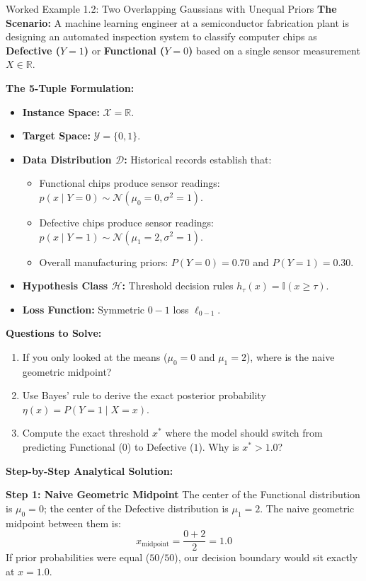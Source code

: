 \begin{examplebox}{Worked Example 1.2: Two Overlapping Gaussians with Unequal Priors}
\label{ex:w01_overlapping_gaussians}
\textbf{The Scenario:}
A machine learning engineer at a semiconductor fabrication plant is designing an automated inspection system to classify computer chips as \textbf{Defective ($Y = 1$)} or \textbf{Functional ($Y = 0$)} based on a single sensor measurement $X \in \mathbb{R}$.

\textbf{The 5-Tuple Formulation:}
\begin{itemize}
    \item \textbf{Instance Space:} $\mathcal{X} = \mathbb{R}$.
    \item \textbf{Target Space:} $\mathcal{Y} = \{0, 1\}$.
    \item \textbf{Data Distribution $\mathcal{D}$:} Historical records establish that:
    \begin{itemize}
        \item Functional chips produce sensor readings: $p(x \mid Y=0) \sim \mathcal{N}(\mu_0 = 0, \sigma^2 = 1)$.
        \item Defective chips produce sensor readings: $p(x \mid Y=1) \sim \mathcal{N}(\mu_1 = 2, \sigma^2 = 1)$.
        \item Overall manufacturing priors: $P(Y=0) = 0.70$ and $P(Y=1) = 0.30$.
    \end{itemize}
    \item \textbf{Hypothesis Class $\mathcal{H}$:} Threshold decision rules $h_\tau(x) = \mathbb{I}(x \ge \tau)$.
    \item \textbf{Loss Function:} Symmetric $0-1$ loss $\ell_{0-1}$.
\end{itemize}

\textbf{Questions to Solve:}
\begin{enumerate}
    \item If you only looked at the means ($\mu_0 = 0$ and $\mu_1 = 2$), where is the naive geometric midpoint?
    \item Use Bayes' rule to derive the exact posterior probability $\eta(x) = P(Y = 1 \mid X = x)$.
    \item Compute the exact threshold $x^*$ where the model should switch from predicting Functional ($0$) to Defective ($1$). Why is $x^* > 1.0$?
\end{enumerate}

\tcblower
\textbf{Step-by-Step Analytical Solution:}

\textbf{Step 1: Naive Geometric Midpoint}
The center of the Functional distribution is $\mu_0 = 0$; the center of the Defective distribution is $\mu_1 = 2$.
The naive geometric midpoint between them is:
\begin{equation*}
x_{\text{midpoint}} = \frac{0 + 2}{2} = \mathbf{1.0}
\end{equation*}
If prior probabilities were equal ($50/50$), our decision boundary would sit exactly at $x = 1.0$.


\end{examplebox}
